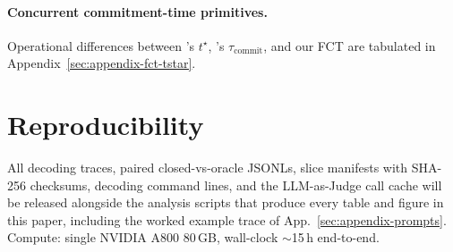 \documentclass[11pt]{article}
\begin{document}
\paragraph{Concurrent commitment-time primitives.} Operational differences between \citet{datta_large_2026}'s $t^\star$, \citet{zhang_when_2026}'s $\tau_{\text{commit}}$, and our FCT are tabulated in Appendix~\ref{sec:appendix-fct-tstar}.

\section{Reproducibility}
\label{sec:appendix-repro}

All decoding traces, paired closed-vs-oracle JSONLs, slice manifests with SHA-256 checksums, decoding command lines, and the LLM-as-Judge call cache will be released alongside the analysis scripts that produce every table and figure in this paper, including the worked example trace of App.~\ref{sec:appendix-prompts}. Compute: single NVIDIA A800 80\,GB, wall-clock $\sim$15\,h end-to-end.
\end{document}

